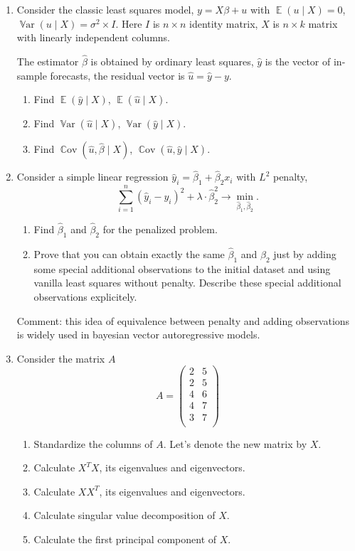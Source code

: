 \documentclass[12pt]{article}
\DeclareMathOperator{\Cov}{\mathbb{C}ov}
\DeclareMathOperator{\Var}{\mathbb{V}ar}
\DeclareMathOperator{\E}{\mathbb{E}}
\begin{document}
\begin{enumerate}
\item Consider the classic least squares model, $y = X\beta + u$ with $\E(u \mid X) = 0$, $\Var(u \mid X) = \sigma^2 \times I$. 
Here $I$ is $n \times n$ identity matrix, $X$ is $n \times k$ matrix with linearly independent columns. 

The estimator $\hat \beta$ is obtained by ordinary least squares, $\hat y$ is the vector of in-sample forecasts,
the residual vector is $\hat u = \hat y - y$. 

\begin{enumerate}
    \item Find $\E(\hat y \mid X)$, $\E(\hat u \mid X)$.
    \item Find $\Var(\hat u \mid X)$, $\Var(\hat y \mid X)$.
    \item Find $\Cov(\hat u, \hat \beta \mid X)$, $\Cov(\hat u, \hat y \mid X)$.
\end{enumerate}

\item Consider a simple linear regression $\hat y_i = \hat \beta_1 + \hat\beta_2 x_i$ with $L^2$ penalty,
\[
\sum_{i=1}^n (\hat y_i - y_i)^2  + \lambda \cdot \hat\beta_2^2 \to \underset{\hat\beta_1, \hat\beta_2}{\min}.
\]

\begin{enumerate}
    \item Find $\hat\beta_1$ and $\hat\beta_2$ for the penalized problem. 
    \item Prove that you can obtain exactly the same $\hat\beta_1$ and $\hat\beta_2$ 
    just by adding some special additional observations to the initial dataset and using vanilla least squares without penalty. 
    Describe these special additional observations explicitely. 
\end{enumerate}

Comment: this idea of equivalence between penalty and adding observations is widely used in bayesian vector autoregressive models.  


\item Consider the matrix $A$
\[
    A = \begin{pmatrix}
        2 & 5 \\
        2 & 5 \\
        4 & 6 \\
        4 & 7 \\
        3 & 7 \\
    \end{pmatrix}
\]

\begin{enumerate}
    \item Standardize the columns of $A$. Let's denote the new matrix by $X$.
    \item Calculate $X^TX$, its eigenvalues and eigenvectors.
    \item Calculate $XX^T$, its eigenvalues and eigenvectors.
    \item Calculate singular value decomposition of $X$. 
    \item Calculate the first principal component of $X$. 
\end{enumerate}

\end{enumerate}
\end{document}
